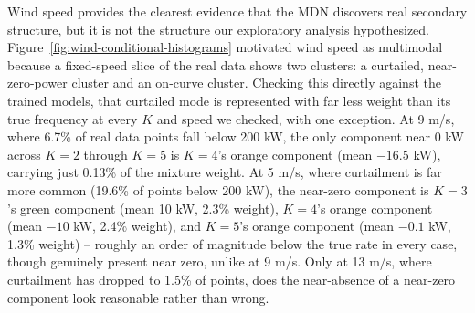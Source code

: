 %


Wind speed provides the clearest evidence that the MDN discovers real secondary structure, but it is not the structure our exploratory analysis hypothesized.
Figure~\ref{fig:wind-conditional-histograms} motivated wind speed as multimodal because a fixed-speed slice of the real data shows two clusters: a curtailed, near-zero-power cluster and an on-curve cluster.
Checking this directly against the trained models, that curtailed mode is represented with far less weight than its true frequency at every $K$ and speed we checked, with one exception.
At 9 m/s, where 6.7\% of real data points fall below 200 kW, the only component near 0 kW across $K=2$ through $K=5$ is $K=4$'s orange component (mean $-16.5$ kW), carrying just 0.13\% of the mixture weight.
At 5 m/s, where curtailment is far more common (19.6\% of points below 200 kW), the near-zero component is $K=3$'s green component (mean 10 kW, 2.3\% weight), $K=4$'s orange component (mean $-10$ kW, 2.4\% weight), and $K=5$'s orange component (mean $-0.1$ kW, 1.3\% weight) -- roughly an order of magnitude below the true rate in every case, though genuinely present near zero, unlike at 9 m/s.
Only at 13 m/s, where curtailment has dropped to 1.5\% of points, does the near-absence of a near-zero component look reasonable rather than wrong.

